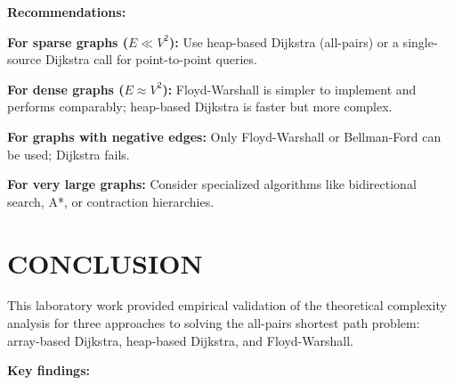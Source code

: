 \documentclass[12pt, a4paper]{report}
\begin{document}
\textbf{Recommendations:}
\begin{dashenum}
  \item \textbf{For sparse graphs ($E \ll V^2$):} Use heap-based Dijkstra (all-pairs) or a single-source Dijkstra call for point-to-point queries.
  \item \textbf{For dense graphs ($E \approx V^2$):} Floyd-Warshall is simpler to implement and performs comparably; heap-based Dijkstra is faster but more complex.
  \item \textbf{For graphs with negative edges:} Only Floyd-Warshall or Bellman-Ford can be used; Dijkstra fails.
  \item \textbf{For very large graphs:} Consider specialized algorithms like bidirectional search, A*, or contraction hierarchies.
\end{dashenum}

\chapter{CONCLUSION}

This laboratory work provided empirical validation of the theoretical complexity analysis for three approaches to solving the all-pairs shortest path problem: array-based Dijkstra, heap-based Dijkstra, and Floyd-Warshall.

\textbf{Key findings:}
\end{document}
